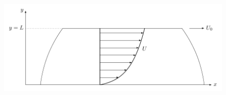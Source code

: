 \begin{figure}[H]
  \centering
  \includegraphics{illustrasjoner/couette-poiseuille.pdf}
  \label{fig:label}
\end{figure}






\clearpage



